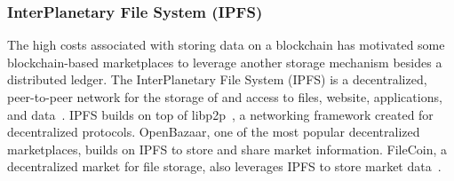 \subsubsection{ InterPlanetary File System (IPFS)}
The high costs associated with storing data on a blockchain has motivated some blockchain-based marketplaces to leverage another storage mechanism besides a distributed ledger.
The InterPlanetary File System (IPFS) is a decentralized, peer-to-peer network for the storage of and access to files, website, applications, and data~\cite{benet2014ipfs}.
IPFS builds on top of libp2p~\cite{benet2018libp2p}, a networking framework created for decentralized protocols.
OpenBazaar, one of the most popular decentralized marketplaces, builds on IPFS to store and share market information.
FileCoin, a decentralized market for file storage, also leverages IPFS to store market data~\cite{benet2018filecoin}.

